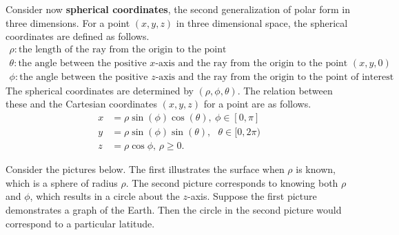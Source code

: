 Consider now  \textbf{spherical coordinates}, the second generalization of polar form in three dimensions. For a point $(x,y,z)$ in three dimensional space, the spherical coordinates are defined as follows.
\begin{equation*}
\begin{array}{l}
\rho: \mbox{the length of the ray from the origin to the point}\\
\theta: \mbox{the angle between the positive $x$-axis and the ray from the origin to the point $(x,y,0)$}\\
\phi: \mbox{the angle between the positive $z$-axis and the ray from the origin to the point of interest}
\end{array}
\end{equation*}
The spherical coordinates are determined by $\left( \rho ,\phi
,\theta \right) $. The relation between these and the Cartesian coordinates $\left( x,y,z \right)$ for a point
are as follows.  
\begin{align*}
x& =\rho \sin \left( \phi \right) \cos \left( \theta \right) ,\ \phi \in 
\left[ 0,\pi \right]  \\
y& =\rho \sin \left( \phi \right) \sin \left( \theta \right) ,\text{ }\theta
\in \lbrack 0,2\pi ) \\
z& =\rho \cos \phi \text{, }\rho \geq 0.
\end{align*}

Consider the pictures below. The first illustrates the surface when $\rho$ is known, which is a sphere of radius $\rho$. The second picture corresponds to knowing both $\rho $ and $\phi$, which results in a circle about the $z$-axis. Suppose the first picture demonstrates a graph of the Earth. Then the circle in the second picture would
correspond to a particular latitude. 

\begin{center}
\end{center}


